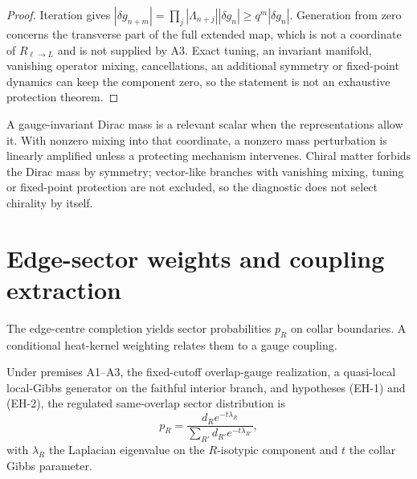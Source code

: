 \documentclass[11pt]{article}
\begin{document}
\begin{proof}
Iteration gives
\(|\delta g_{n+m}|=\prod_{j}|\Lambda_{n+j}||\delta g_n|\ge q^m|\delta g_n|\).
Generation from zero concerns the transverse part of the full extended map,
which is not a coordinate of \(R_{\ell\to L}\) and is not supplied by A3. Exact
tuning, an invariant manifold, vanishing operator mixing, cancellations, an
additional symmetry or fixed-point dynamics can keep the component zero, so
the statement is not an exhaustive protection theorem.
\end{proof}

A gauge-invariant Dirac mass is a relevant scalar when the representations
allow it. With nonzero mixing into that coordinate, a nonzero mass
perturbation is linearly amplified unless a protecting mechanism intervenes.
Chiral matter forbids the Dirac mass by symmetry; vector-like branches with
vanishing mixing, tuning or fixed-point protection are not excluded, so the
diagnostic does not select chirality by itself.

\section{Edge-sector weights and coupling extraction}
\label{sec:heat-kernel}

The edge-centre completion yields sector probabilities \(p_R\) on collar
boundaries. A conditional heat-kernel weighting relates them to a gauge
coupling.

\begin{theorem}
\label{thm:edge-sector-law}
Under premises A1--A3, the fixed-cutoff overlap-gauge realization, a
quasi-local local-Gibbs generator on the faithful interior branch, and
hypotheses (EH-1) and (EH-2), the regulated same-overlap sector distribution
is
\[
p_R=\frac{d_Re^{-t\lambda_R}}{\sum_{R'}d_{R'}e^{-t\lambda_{R'}}},
\]
with \(\lambda_R\) the Laplacian eigenvalue on the \(R\)-isotypic component
and \(t\) the collar Gibbs parameter.
\end{theorem}
\end{document}
